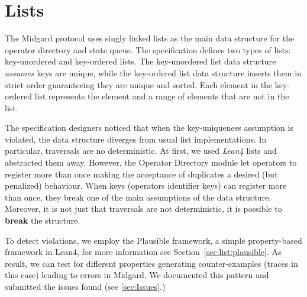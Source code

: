 \begin{definition}
  \leanok
  \label{dfn:ComputationalRelation.CompositionAndOps.computational_conditional}
  \end{definition}


\section{Lists}

The Midgard protocol uses singly linked lists as the main data structure for the
operator directory and state queue.
%
The specification defines two types of lists: key-unordered and key-ordered lists.
%
The key-unordered list data structure \emph{assumes} keys are unique, while the
key-ordered list data structure inserts them in strict order guaranteeing they
are unique and sorted.
%
Each element in the key-ordered list represents the element and a range of
elements that are not in the list.

The specification designers noticed that when the key-uniqueness
assumption is violated, the data structure diverges from usual list
implementations.
%
In particular, traversals are no deterministic.
%
At first, we used \emph{Lean4} lists and abstracted them away.
%
However, the Operator Directory module let operators to register more than once
making the acceptance of duplicates a desired (but penalized) behaviour.
%
When keys (operators identifier keys) can register more than once, they break
one of the main assumptions of the data structure.
%
Moreover, it is not just that traversals are not deterministic, it is possible
to \textbf{break} the structure.

To detect violations, we employ the Plausible framework, a simple
property-based framework in Lean4, for more information see
Section~\ref{sec:list:plausible}.
%
As result, we can test for different properties generating counter-examples
(traces in this case) leading to errors in Midgard.
%
We documented this pattern and submitted the issues found (see \ref{sec:Issues}.)



